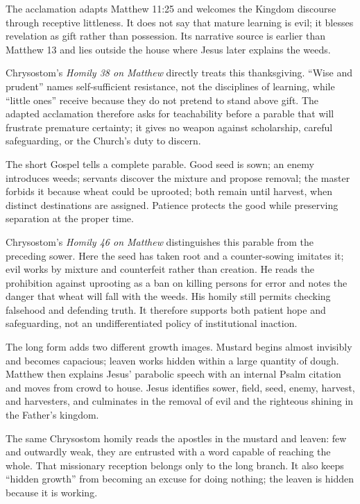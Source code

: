 The acclamation adapts Matthew 11:25 and welcomes the Kingdom discourse through receptive littleness. It does not say that mature learning is evil; it blesses revelation as gift rather than possession. Its narrative source is earlier than Matthew 13 and lies outside the house where Jesus later explains the weeds.

Chrysostom's \emph{Homily 38 on Matthew} directly treats this thanksgiving. “Wise and prudent” names self-sufficient resistance, not the disciplines of learning, while “little ones” receive because they do not pretend to stand above gift. The adapted acclamation therefore asks for teachability before a parable that will frustrate premature certainty; it gives no weapon against scholarship, careful safeguarding, or the Church's duty to discern.

The short Gospel tells a complete parable. Good seed is sown; an enemy introduces weeds; servants discover the mixture and propose removal; the master forbids it because wheat could be uprooted; both remain until harvest, when distinct destinations are assigned. Patience protects the good while preserving separation at the proper time.

Chrysostom's \emph{Homily 46 on Matthew} distinguishes this parable from the preceding sower. Here the seed has taken root and a counter-sowing imitates it; evil works by mixture and counterfeit rather than creation. He reads the prohibition against uprooting as a ban on killing persons for error and notes the danger that wheat will fall with the weeds. His homily still permits checking falsehood and defending truth. It therefore supports both patient hope and safeguarding, not an undifferentiated policy of institutional inaction.

The long form adds two different growth images. Mustard begins almost invisibly and becomes capacious; leaven works hidden within a large quantity of dough. Matthew then explains Jesus' parabolic speech with an internal Psalm citation and moves from crowd to house. Jesus identifies sower, field, seed, enemy, harvest, and harvesters, and culminates in the removal of evil and the righteous shining in the Father's kingdom.

The same Chrysostom homily reads the apostles in the mustard and leaven: few and outwardly weak, they are entrusted with a word capable of reaching the whole. That missionary reception belongs only to the long branch. It also keeps “hidden growth” from becoming an excuse for doing nothing; the leaven is hidden because it is working.

